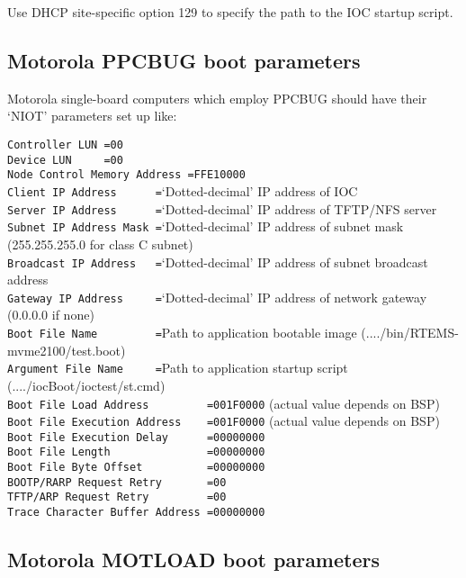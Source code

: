 Use DHCP site-specific option 129 to specify the path to the IOC startup script.

\subsection{Motorola PPCBUG boot parameters}

Motorola single-board computers which employ PPCBUG should have their `NIOT' parameters set up like:

\noindent
\verb|Controller LUN =00|\\
\verb|Device LUN     =00|\\
\verb|Node Control Memory Address =FFE10000|\\
\verb|Client IP Address      =|`Dotted-decimal' IP address of IOC\\
\verb|Server IP Address      =|`Dotted-decimal' IP address of TFTP/NFS server\\
\verb|Subnet IP Address Mask =|`Dotted-decimal' IP address of subnet mask (255.255.255.0 for class C subnet)\\
\verb|Broadcast IP Address   =|`Dotted-decimal' IP address of subnet broadcast address\\
\verb|Gateway IP Address     =|`Dotted-decimal' IP address of network gateway (0.0.0.0 if none)\\
\verb|Boot File Name         =|Path to application bootable image (..../bin/RTEMS-mvme2100/test.boot)\\
\verb|Argument File Name     =|Path to application startup script (..../iocBoot/ioctest/st.cmd)\\
\verb|Boot File Load Address         =001F0000| (actual value depends on BSP)\\
\verb|Boot File Execution Address    =001F0000| (actual value depends on BSP)\\
\verb|Boot File Execution Delay      =00000000|\\
\verb|Boot File Length               =00000000|\\
\verb|Boot File Byte Offset          =00000000|\\
\verb|BOOTP/RARP Request Retry       =00      |\\
\verb|TFTP/ARP Request Retry         =00      |\\
\verb|Trace Character Buffer Address =00000000|

\subsection{Motorola MOTLOAD boot parameters}

